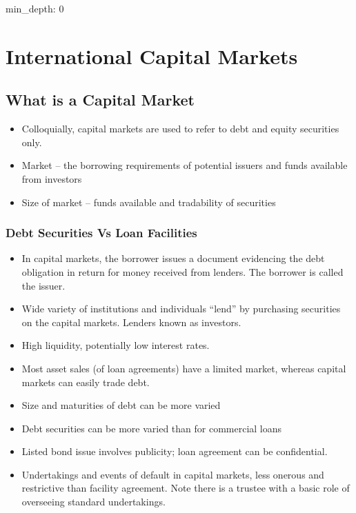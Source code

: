 \documentclass[
]{article}
\author{}
\date{}
\newenvironment{Shaded}{}{}
\newcommand{\NormalTok}[1]{#1}
\providecommand{\tightlist}{%
  \setlength{\itemsep}{0pt}\setlength{\parskip}{0pt}}
\begin{document}
{
\setcounter{tocdepth}{3}
\tableofcontents
}
\begin{Shaded}
\begin{Highlighting}[]
\NormalTok{min\_depth: 0}
\end{Highlighting}
\end{Shaded}

\hypertarget{international-capital-markets}{%
\section{International Capital
Markets}\label{international-capital-markets}}

\hypertarget{what-is-a-capital-market}{%
\subsection{What is a Capital Market}\label{what-is-a-capital-market}}

\begin{itemize}
\tightlist
\item
  Colloquially, capital markets are used to refer to debt and equity
  securities only.
\item
  Market -- the borrowing requirements of potential issuers and funds
  available from investors
\item
  Size of market -- funds available and tradability of securities
\end{itemize}

\hypertarget{debt-securities-vs-loan-facilities}{%
\subsubsection{Debt Securities Vs Loan
Facilities}\label{debt-securities-vs-loan-facilities}}

\begin{itemize}
\tightlist
\item
  In capital markets, the borrower issues a document evidencing the debt
  obligation in return for money received from lenders. The borrower is
  called the issuer.
\item
  Wide variety of institutions and individuals ``lend'' by purchasing
  securities on the capital markets. Lenders known as investors.
\item
  High liquidity, potentially low interest rates.
\item
  Most asset sales (of loan agreements) have a limited market, whereas
  capital markets can easily trade debt.
\item
  Size and maturities of debt can be more varied
\item
  Debt securities can be more varied than for commercial loans
\item
  Listed bond issue involves publicity; loan agreement can be
  confidential.
\item
  Undertakings and events of default in capital markets, less onerous
  and restrictive than facility agreement. Note there is a trustee with
  a basic role of overseeing standard undertakings.
\end{itemize}
\end{document}
